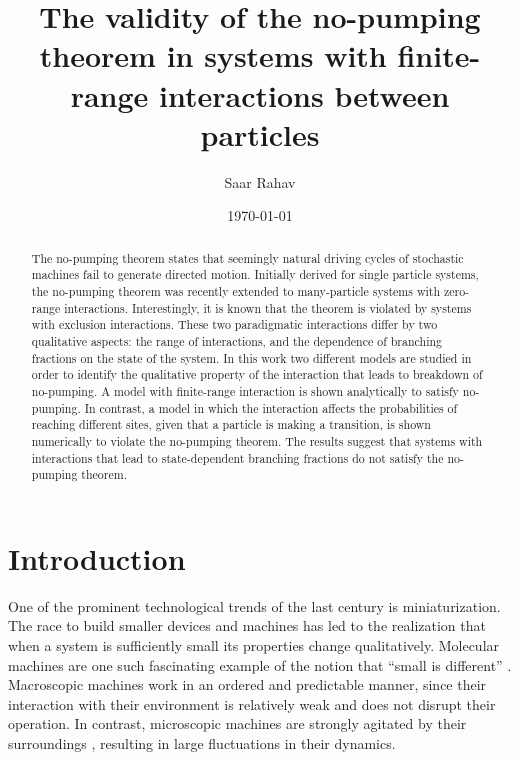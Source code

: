 \documentclass[aps,pre,showpacs,amsmath,amssymb,amsfonts,superscriptaddress,onecolumn,longbibliography]{revtex4-1}
\begin{document}
\title{The validity of the no-pumping theorem in systems with finite-range interactions between particles}

\author{Saar Rahav}


\date{\today}

\begin{abstract}
The no-pumping theorem states that seemingly natural driving cycles of
stochastic machines fail to generate directed motion. Initially derived for single particle systems, the no-pumping theorem
was recently extended to many-particle systems with zero-range interactions. Interestingly, it is known
that the theorem is violated by systems with exclusion interactions.
These two paradigmatic interactions differ by two qualitative aspects: the range of interactions, and
the dependence of branching fractions on the state of the system.
In this work two different models are studied in order to identify the
qualitative property of the interaction that leads to breakdown of no-pumping. A model with finite-range interaction is
shown analytically to satisfy no-pumping. In contrast, a model in which the interaction affects the probabilities of
reaching different sites, given that a particle is making a transition, is shown numerically to violate the no-pumping theorem.
The results suggest that systems with interactions that lead to state-dependent branching fractions do not satisfy the
no-pumping theorem.
\end{abstract}


\maketitle


\section{Introduction}
\label{sec:intro}

One of the prominent technological trends of the last century is miniaturization. The race to build
 smaller devices and machines has led to the realization that when a system is sufficiently small
its properties change qualitatively. Molecular machines are one such fascinating example of the notion that ``small is different'' \citep{howard_mechanics_2001-1,coskun_great_2011,kay_synthetic_2007,kottas_artificial_2005,michl_molecular_2009,feringa_art_2007}.
Macroscopic machines work in an ordered and predictable manner, since their interaction with their environment
is relatively weak and does not disrupt their operation. In contrast, microscopic machines are strongly agitated by their surroundings  \cite{Bustamante2005},
resulting in large fluctuations in their dynamics.
\end{document}
